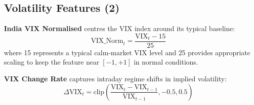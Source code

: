 \documentclass[10pt,a4paper,twoside]{article}
\begin{document}
\subsection{Volatility Features (2)}

\textbf{India VIX Normalised} centres the VIX index around its typical baseline:
\begin{equation}
  \text{VIX\_Norm}_t = \frac{\text{VIX}_t - 15}{25}
\end{equation}
where 15 represents a typical calm-market VIX level and 25 provides appropriate
scaling to keep the feature near $[-1, +1]$ in normal conditions.

\textbf{VIX Change Rate} captures intraday regime shifts in implied volatility:
\begin{equation}
  \Delta\text{VIX}_t = \text{clip}\!\left(\frac{\text{VIX}_t - \text{VIX}_{t-1}}
  {\text{VIX}_{t-1}}, -0.5, 0.5\right)
\end{equation}
\end{document}
